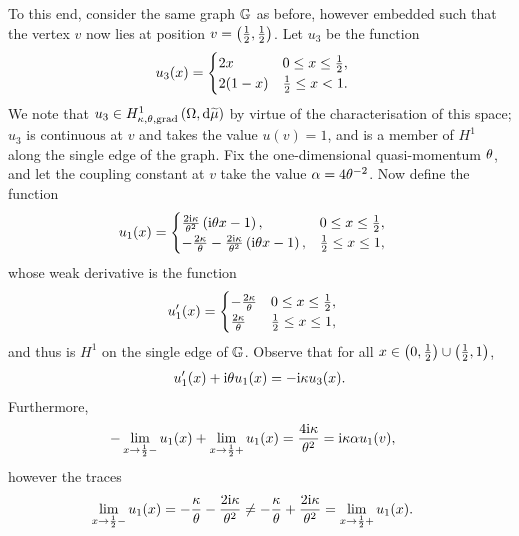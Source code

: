 To this end, consider the same graph $\mathbb{G}$ as before, however embedded such that the vertex $v$ now lies at position $v = \left( \frac{1}{2},\frac{1}{2} \right)$.
Let $u_3$ be the function
\begin{align*}
    u_3(x) &=
    \begin{cases}
        2x & 0 \leq x \leq \frac{1}{2}, \\
        2(1-x) & \frac{1}{2} \leq x < 1.
    \end{cases}
\end{align*}
We note that $u_3\in H^1_{\kappa,\theta,\mathrm{grad}}\left( \Omega, \mathrm{d}\widetilde{\mu} \right)$ by virtue of the characterisation of this space; $u_3$ is continuous at $v$ and takes the value $u(v)=1$, and is a member of $H^1$ along the single edge of the graph.
Fix the one-dimensional quasi-momentum $\theta$, and let the coupling constant at $v$ take the value $\alpha = 4\theta^{-2}$.
Now define the function
\begin{align*}
    u_1(x) &=
    \begin{cases}
        \frac{2\mathrm{i}\kappa}{\theta^2}\left( \mathrm{i}\theta x - 1 \right), 
        & 0\leq x\leq \frac{1}{2}, \\
        -\frac{2\kappa}{\theta} - \frac{2\mathrm{i}\kappa}{\theta^2}\left( \mathrm{i}\theta x - 1 \right), 
        & \frac{1}{2}\leq x\leq 1,
    \end{cases}
\end{align*}
whose weak derivative is the function
\begin{align*}
    u_1'(x) &=
    \begin{cases}
        -\frac{2\kappa}{\theta} & 0\leq x\leq \frac{1}{2}, \\
        \frac{2\kappa}{\theta} & \frac{1}{2}\leq x\leq 1,
    \end{cases}
\end{align*}
and thus is $H^1$ on the single edge of $\mathbb{G}$.
Observe that for all $x\in\left( 0,\frac{1}{2} \right)\cup\left( \frac{1}{2},1 \right)$,
\begin{align*}
    u_1'(x) + \mathrm{i}\theta u_1(x) = -\mathrm{i}\kappa u_3(x).
\end{align*}
Furthermore,
\begin{align*}
    -\lim_{x\rightarrow\frac{1}{2}-}u_1(x) + \lim_{x\rightarrow\frac{1}{2}+}u_1(x)
    &= \frac{4\mathrm{i}\kappa}{\theta^2} = \mathrm{i}\kappa\alpha u_1(v),
\end{align*}
however the traces 
\begin{align*}
    \lim_{x\rightarrow\frac{1}{2}-}u_1(x) 
    &= -\frac{\kappa}{\theta} - \frac{2\mathrm{i}\kappa}{\theta^2}
    \neq -\frac{\kappa}{\theta} + \frac{2\mathrm{i}\kappa}{\theta^2} 
    = \lim_{x\rightarrow\frac{1}{2}+}u_1(x).
\end{align*}

